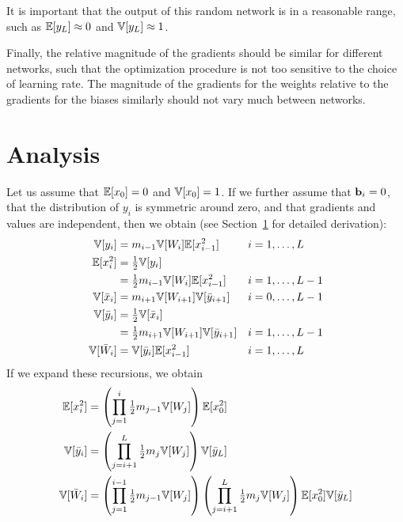 It is important that the output of this random network is in a reasonable range, such as $\mathbb{E}[y_{L}] \approx 0$ and $\mathbb{V}[y_{L}] \approx 1$.

Finally, the relative magnitude of the gradients should be similar for different networks, such that the optimization procedure is not too sensitive to the choice of learning rate.
The magnitude of the gradients for the weights relative to the gradients for the biases similarly should not vary much between networks.

\section{Analysis}

Let us assume that $\mathbb{E}[x_{0}] = 0$ and $\mathbb{V}[x_{0}] = 1$.
If we further assume that $\boldsymbol{\mathbf{b}}_{i} = 0$, that the distribution of $y_{i}$ is symmetric around zero, and that gradients and values are independent, then we obtain (see Section~\ref{} for detailed derivation):
\begin{align}
\mathbb{V}[y_{i}] & = m_{i - 1} \mathbb{V}[W_{i}] \mathbb{E}[x_{i - 1}^2] && i = 1, \dots, L \\
\mathbb{E}[x_{i}^2] & = \tfrac{1}{2} \mathbb{V}[y_{i}] \nonumber \\
& = \tfrac{1}{2} m_{i - 1} \mathbb{V}[W_{i}] \mathbb{E}[x_{i - 1}^2] && i = 1, \dots, L-1 \\
\mathbb{V}[\bar{x}_{i}] & = m_{i+1} \mathbb{V}[W_{i+1}] \mathbb{V}[\bar{y}_{i+1}] && i = 0, \dots, L-1 \\
\mathbb{V}[\bar{y}_{i}] & = \tfrac{1}{2} \mathbb{V}[\bar{x}_{i}] \nonumber \\
& = \tfrac{1}{2} m_{i+1} \mathbb{V}[W_{i+1}] \mathbb{V}[\bar{y}_{i+1}] && i = 1, \dots, L-1 \\
\mathbb{V}[\bar{W}_{i}] & = \mathbb{V}[\bar{y}_{i}] \mathbb{E}[x_{i-1}^2] && i = 1, \dots, L
\end{align}
If we expand these recursions, we obtain
\begin{align}
\mathbb{E}[x_{i}^2] & = \left( \prod_{j = 1}^{i} \tfrac{1}{2} m_{j - 1} \mathbb{V}[W_{j}] \right) \mathbb{E}[x_{0}^2] \\
\mathbb{V}[\bar{y}_{i}] & = \left( \prod_{j = i+1}^{L} \tfrac{1}{2} m_{j} \mathbb{V}[W_{j}] \right) \mathbb{V}[\bar{y}_{L}] \\
\mathbb{V}[\bar{W}_{i}] & =
  \left( \prod_{j = 1}^{i-1} \tfrac{1}{2} m_{j - 1} \mathbb{V}[W_{j}] \right)
  \left( \prod_{j = i+1}^{L} \tfrac{1}{2} m_{j} \mathbb{V}[W_{j}] \right)
  \mathbb{E}[x_{0}^2] \mathbb{V}[\bar{y}_{L}]
\end{align}
